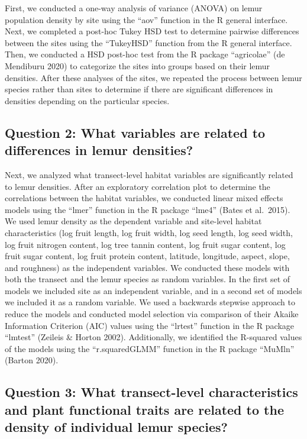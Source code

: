 \documentclass[
  12pt,
]{article}
\begin{document}
First, we conducted a one-way analysis of variance (ANOVA) on lemur
population density by site using the ``aov'' function in the R general
interface. Next, we completed a post-hoc Tukey HSD test to determine
pairwise differences between the sites using the ``TukeyHSD'' function
from the R general interface. Then, we conducted a HSD post-hoc test
from the R package ``agricolae'' (de Mendiburu 2020) to categorize the
sites into groups based on their lemur densities. After these analyses
of the sites, we repeated the process between lemur species rather than
sites to determine if there are significant differences in densities
depending on the particular species.

\hypertarget{question-2-what-variables-are-related-to-differences-in-lemur-densities}{%
\subsection{Question 2: What variables are related to differences in
lemur
densities?}\label{question-2-what-variables-are-related-to-differences-in-lemur-densities}}

Next, we analyzed what transect-level habitat variables are
significantly related to lemur densities. After an exploratory
correlation plot to determine the correlations between the habitat
variables, we conducted linear mixed effects models using the ``lmer''
function in the R package ``lme4'' (Bates et al.~2015). We used lemur
density as the dependent variable and site-level habitat characteristics
(log fruit length, log fruit width, log seed length, log seed width, log
fruit nitrogen content, log tree tannin content, log fruit sugar
content, log fruit sugar content, log fruit protein content, latitude,
longitude, aspect, slope, and roughness) as the independent variables.
We conducted these models with both the transect and the lemur species
as random variables. In the first set of models we included site as an
independent variable, and in a second set of models we included it as a
random variable. We used a backwards stepwise approach to reduce the
models and conducted model selection via comparison of their Akaike
Information Criterion (AIC) values using the ``lrtest'' function in the
R package ``lmtest'' (Zeileis \& Horton 2002). Additionally, we
identified the R-squared values of the models using the
``r.squaredGLMM'' function in the R package ``MuMln'' (Barton 2020).

\hypertarget{question-3-what-transect-level-characteristics-and-plant-functional-traits-are-related-to-the-density-of-individual-lemur-species}{%
\subsection{Question 3: What transect-level characteristics and plant
functional traits are related to the density of individual lemur
species?}\label{question-3-what-transect-level-characteristics-and-plant-functional-traits-are-related-to-the-density-of-individual-lemur-species}}
\end{document}
